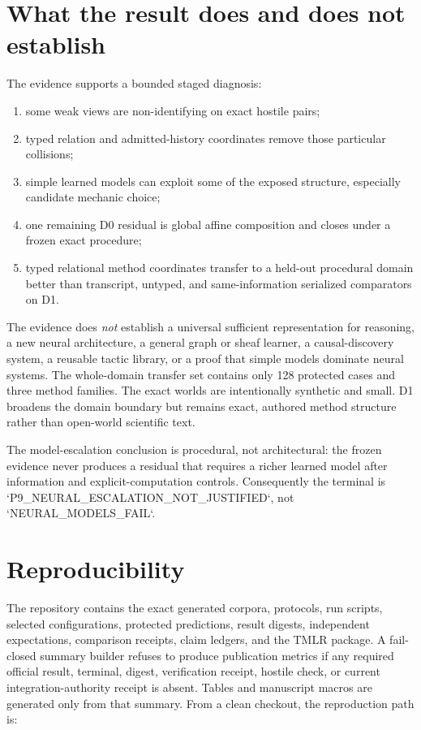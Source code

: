 \documentclass[10pt]{article}
\begin{document}
\section{What the result does and does not establish}

The evidence supports a bounded staged diagnosis:
\begin{enumerate}
    \item some weak views are non-identifying on exact hostile pairs;
    \item typed relation and admitted-history coordinates remove those particular collisions;
    \item simple learned models can exploit some of the exposed structure, especially candidate mechanic choice;
    \item one remaining D0 residual is global affine composition and closes under a frozen exact procedure;
    \item typed relational method coordinates transfer to a held-out procedural domain better than transcript, untyped, and same-information serialized comparators on D1.
\end{enumerate}

The evidence does \emph{not} establish a universal sufficient representation for reasoning, a new neural architecture, a general graph or sheaf learner, a causal-discovery system, a reusable tactic library, or a proof that simple models dominate neural systems. The whole-domain transfer set contains only 128 protected cases and three method families. The exact worlds are intentionally synthetic and small. D1 broadens the domain boundary but remains exact, authored method structure rather than open-world scientific text.

The model-escalation conclusion is procedural, not architectural: the frozen evidence never produces a residual that requires a richer learned model after information and explicit-computation controls. Consequently the terminal is `P9_NEURAL_ESCALATION_NOT_JUSTIFIED`, not `NEURAL_MODELS_FAIL`.

\section{Reproducibility}

The repository contains the exact generated corpora, protocols, run scripts, selected configurations, protected predictions, result digests, independent expectations, comparison receipts, claim ledgers, and the TMLR package. A fail-closed summary builder refuses to produce publication metrics if any required official result, terminal, digest, verification receipt, hostile check, or current integration-authority receipt is absent. Tables and manuscript macros are generated only from that summary. From a clean checkout, the reproduction path is:
\end{document}
